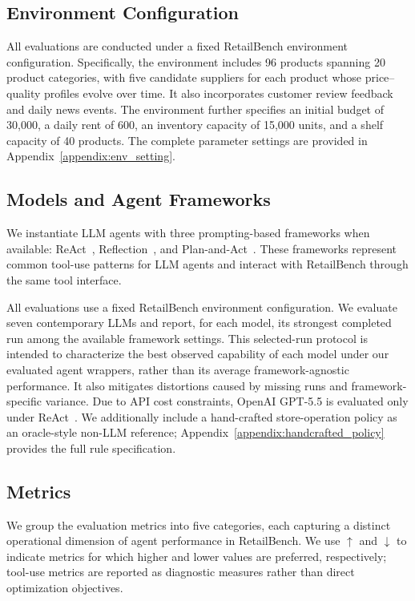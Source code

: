 \subsection{Environment Configuration}

All evaluations are conducted under a fixed RetailBench environment configuration. Specifically, the environment includes 96 products spanning 20 product categories, with five candidate suppliers for each product whose price--quality profiles evolve over time. It also incorporates customer review feedback and daily news events. The environment further specifies an initial budget of 30{,}000, a daily rent of 600, an inventory capacity of 15{,}000 units, and a shelf capacity of 40 products. The complete parameter settings are provided in Appendix~\ref{appendix:env_setting}.

\subsection{Models and Agent Frameworks}

We instantiate LLM agents with three prompting-based frameworks when available: ReAct~\citep{yao2023react}, Reflection~\citep{reflection}, and Plan-and-Act~\citep{erdogan2025planandactimprovingplanningagents}. These frameworks represent common tool-use patterns for LLM agents and interact with RetailBench through the same tool interface.

All evaluations use a fixed RetailBench environment configuration. We evaluate seven contemporary LLMs and report, for each model, its strongest completed run among the available framework settings. This selected-run protocol is intended to characterize the best observed capability of each model under our evaluated agent wrappers, rather than its average framework-agnostic performance. It also mitigates distortions caused by missing runs and framework-specific variance. Due to API cost constraints, OpenAI GPT-5.5 is evaluated only under ReAct~\citep{yao2023react}. We additionally include a hand-crafted store-operation policy as an oracle-style non-LLM reference; Appendix~\ref{appendix:handcrafted_policy} provides the full rule specification.
\subsection{Metrics}

We group the evaluation metrics into five categories, each capturing a distinct operational dimension of agent performance in RetailBench. We use $\uparrow$ and $\downarrow$ to indicate metrics for which higher and lower values are preferred, respectively; tool-use metrics are reported as diagnostic measures rather than direct optimization objectives.

